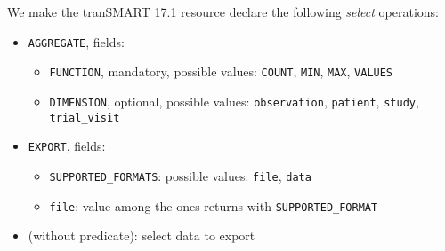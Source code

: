 We make the tranSMART 17.1 resource declare the following \emph{select} operations:
\begin{itemize}
    \item \verb|AGGREGATE|, fields:
    \begin{itemize}
        \item \verb|FUNCTION|, mandatory, possible values:
        \verb|COUNT|,
        \verb|MIN|,
        \verb|MAX|,
        \verb|VALUES|
        
        \item \verb|DIMENSION|, optional, possible values:
        \verb|observation|,
        \verb|patient|,
        \verb|study|,
        \verb|trial_visit|
    \end{itemize}
    
    \item \verb|EXPORT|, fields:
    \begin{itemize}
        \item \verb|SUPPORTED_FORMATS|: possible values: \verb|file|, \verb|data|
        \item \verb|file|: value among the ones returns with \verb|SUPPORTED_FORMAT|
    \end{itemize}
    
    \item (without predicate): select data to export
\end{itemize}

